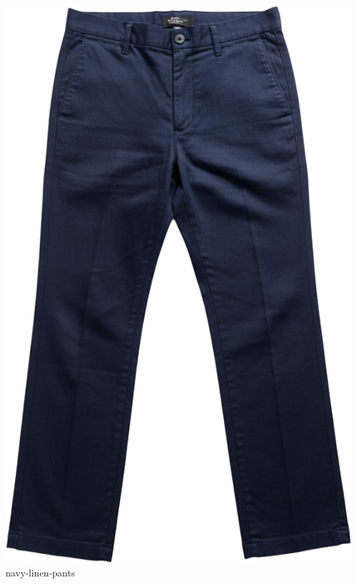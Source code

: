 \documentclass[10pt]{article}
\begin{document}
\begin{minipage}[t]{0.22\textwidth}\centering\vspace{0mm}
\includegraphics[width=\linewidth,keepaspectratio]{assets/pants/navy-linen-pants.png}\\
\vspace{0.5mm}\tiny navy-linen-pants\end{minipage}
\end{document}
